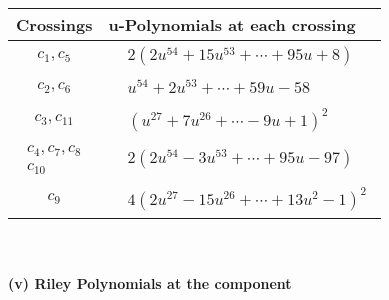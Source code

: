 \documentclass[1p]{elsarticle_modified}
\theoremstyle{definition}
\begin{document}
\begin{tabular}{m{50pt}|m{274pt}}
Crossings & \hspace{64pt}u-Polynomials at each crossing \\
\hline $$\begin{aligned}c_{1},c_{5}\end{aligned}$$&$\begin{aligned}
&2(2 u^{54}+15 u^{53}+\cdots+95 u+8)
\end{aligned}$\\
\hline $$\begin{aligned}c_{2},c_{6}\end{aligned}$$&$\begin{aligned}
&u^{54}+2 u^{53}+\cdots+59 u-58
\end{aligned}$\\
\hline $$\begin{aligned}c_{3},c_{11}\end{aligned}$$&$\begin{aligned}
&(u^{27}+7 u^{26}+\cdots-9 u+1)^{2}
\end{aligned}$\\
\hline $$\begin{aligned}c_{4},c_{7},c_{8}\\c_{10}\end{aligned}$$&$\begin{aligned}
&2(2 u^{54}-3 u^{53}+\cdots+95 u-97)
\end{aligned}$\\
\hline $$\begin{aligned}c_{9}\end{aligned}$$&$\begin{aligned}
&4(2 u^{27}-15 u^{26}+\cdots+13 u^2-1)^{2}
\end{aligned}$\\
\hline
\end{tabular}\\~\\
\newpage\renewcommand{\arraystretch}{1}
\flushleft \textbf{(v) Riley Polynomials at the component}\newline \\
\end{document}
